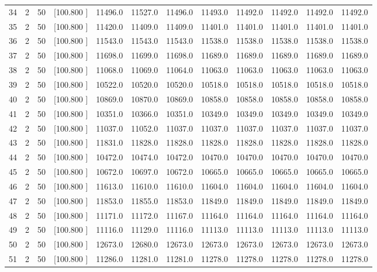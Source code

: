 \documentclass[12pt,a4paper]{article}
\begin{document}
\begin{center}
{\begin{tabular}{r r r r r r r r r r r r}
  34&  2& 50&[100.800   ]& 11496.0& 11527.0& 11496.0& 11493.0& 11492.0& 11492.0& 11492.0& 11492.0\\[-0.02in]
  35&  2& 50&[100.800   ]& 11420.0& 11409.0& 11409.0& 11401.0& 11401.0& 11401.0& 11401.0& 11401.0\\[-0.02in]
  36&  2& 50&[100.800   ]& 11543.0& 11543.0& 11543.0& 11538.0& 11538.0& 11538.0& 11538.0& 11538.0\\[-0.02in]
  37&  2& 50&[100.800   ]& 11698.0& 11699.0& 11698.0& 11689.0& 11689.0& 11689.0& 11689.0& 11689.0\\[-0.02in]
  38&  2& 50&[100.800   ]& 11068.0& 11069.0& 11064.0& 11063.0& 11063.0& 11063.0& 11063.0& 11063.0\\[-0.02in]
  39&  2& 50&[100.800   ]& 10522.0& 10520.0& 10520.0& 10518.0& 10518.0& 10518.0& 10518.0& 10518.0\\[-0.02in]
  40&  2& 50&[100.800   ]& 10869.0& 10870.0& 10869.0& 10858.0& 10858.0& 10858.0& 10858.0& 10858.0\\[-0.02in]
  41&  2& 50&[100.800   ]& 10351.0& 10366.0& 10351.0& 10349.0& 10349.0& 10349.0& 10349.0& 10349.0\\[-0.02in]
  42&  2& 50&[100.800   ]& 11037.0& 11052.0& 11037.0& 11037.0& 11037.0& 11037.0& 11037.0& 11037.0\\[-0.02in]
  43&  2& 50&[100.800   ]& 11831.0& 11828.0& 11828.0& 11828.0& 11828.0& 11828.0& 11828.0& 11828.0\\[-0.02in]
  44&  2& 50&[100.800   ]& 10472.0& 10474.0& 10472.0& 10470.0& 10470.0& 10470.0& 10470.0& 10470.0\\[-0.02in]
  45&  2& 50&[100.800   ]& 10672.0& 10697.0& 10672.0& 10665.0& 10665.0& 10665.0& 10665.0& 10665.0\\[-0.02in]
  46&  2& 50&[100.800   ]& 11613.0& 11610.0& 11610.0& 11604.0& 11604.0& 11604.0& 11604.0& 11604.0\\[-0.02in]
  47&  2& 50&[100.800   ]& 11853.0& 11855.0& 11853.0& 11849.0& 11849.0& 11849.0& 11849.0& 11849.0\\[-0.02in]
  48&  2& 50&[100.800   ]& 11171.0& 11172.0& 11167.0& 11164.0& 11164.0& 11164.0& 11164.0& 11164.0\\[-0.02in]
  49&  2& 50&[100.800   ]& 11116.0& 11129.0& 11116.0& 11113.0& 11113.0& 11113.0& 11113.0& 11113.0\\[-0.02in]
  50&  2& 50&[100.800   ]& 12673.0& 12680.0& 12673.0& 12673.0& 12673.0& 12673.0& 12673.0& 12673.0\\[-0.02in]
  51&  2& 50&[100.800   ]& 11286.0& 11281.0& 11281.0& 11278.0& 11278.0& 11278.0& 11278.0& 11278.0\\[-0.02in]

\end{tabular}}
\end{center}
\end{document}

